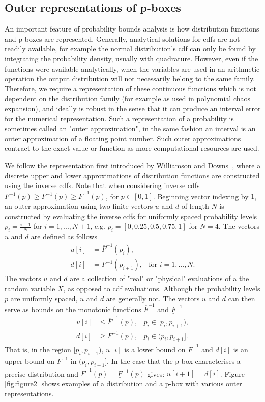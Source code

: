 \documentclass{juliacon}
\begin{document}
\subsection{Outer representations of p-boxes}
\label{sec:outer_approx}
An important feature of probability bounds analysis is how distribution functions and p-boxes are represented. Generally, analytical solutions for cdfs are not readily available, for example the normal distribution's cdf can only be found by integrating the probability density, usually with quadrature. However, even if the functions were available analytically, when the variables are used in an arithmetic operation the output distribution will not necessarily belong to the same family. Therefore, we require a representation of these continuous functions which is not dependent on the distribution family (for example as used in polynomial chaos expansion), and ideally is robust in the sense that it can produce an interval error for the numerical representation. Such a representation of a probability is sometimes called an "outer approximation", in the same fashion an interval is an outer approximation of a floating point number. Such outer approximations contract to the exact value or function as more computational resources are used.

We follow the representation first introduced by Williamson and Downs~\cite{williamson1990probabilistic}, where a discrete upper and lower approximations of distribution functions are constructed using the inverse cdfs. Note that when considering inverse cdfs $\underline{F}^{-1}(p) \geq F^{-1}(p) \geq \overline{F}^{-1}(p)$, for $p \in [0,1]$. Beginning vector indexing by $1$, an outer approximation using two finite vectors $u$ and $d$ of length $N$ is constructed by evaluating the inverse cdfs for uniformly spaced probability levels $p_{i} = \frac{i-1}{N}$ for $i = 1, ... , N+1$, e.g. $p_{i} = [0, 0.25, 0.5, 0.75, 1]$ for $N = 4$. The vectors $u$ and $d$ are defined as follows
\begin{align*}
  u[i] &= \overline{F}^{-1}(p_{i}), \\ 
  d[i] &= \underline{F}^{-1}(p_{i+1}), & \text{for } i = 1, ..., N .
\end{align*}
The vectors $u$ and $d$ are a collection of "real" or "physical" evaluations of a the random variable $X$, as opposed to cdf evaluations. Although the probability levels $p$ are uniformly spaced, $u$ and $d$ are generally not. The vectors $u$ and $d$ can then serve as bounds on the monotonic functions $\overline{F}^{-1}$ and $\underline{F}^{-1}$
\begin{align*}
  u[i] &\leq \overline{F}^{-1}(p), & p_{i} \in [p_{i}, p_{i+1} ),\\ 
  d[i] &\geq \underline{F}^{-1}(p), & p_{i} \in (p_{i}, p_{i+1}].
\end{align*}
That is, in the region $[p_{i}, p_{i+1})$, $u[i]$ is a lower bound on $\overline{F}^{-1}$ and $d[i]$ is an upper bound on $\underline{F}^{-1}$ in $(p_{i}, p_{i+1}]$. In the case that the p-box characterises a precise distribution and $\overline{F}^{-1}(p) = \underline{F}^{-1}(p)$ gives:  $u[i+1] = d[i]$. Figure \ref{fig:figure2} shows examples of a distribution and a p-box with various outer representations.
\end{document}
